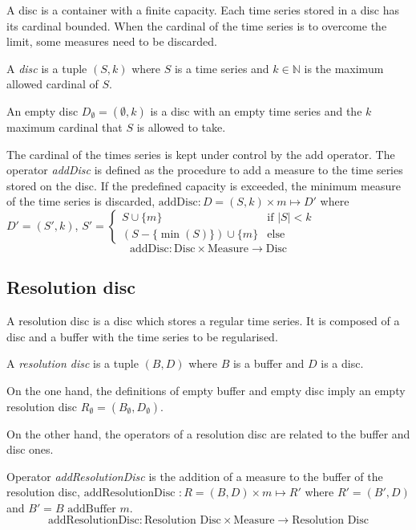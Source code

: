 A disc is a container with a finite capacity. Each time series stored
in a disc has its cardinal bounded. When the cardinal of the time
series is to overcome the limit, some measures need to be discarded.

\begin{definition}[Disc]
  A \emph{disc} is a tuple $(S,k)$ where $S$ is a time
  series and $k\in\mathbb{N}$ is the maximum allowed cardinal of $S$.
\end{definition}

An empty disc $D_{\emptyset} = (\emptyset,k)$ is a disc with an empty
time series and the $k$ maximum cardinal that $S$ is allowed to take.

The cardinal of the times series is kept under control by the add
operator.  The operator \emph{addDisc} is defined as the procedure to
add a measure to the time series stored on the disc. If the predefined
capacity is exceeded, the minimum measure of the time series is
discarded, $\text{addDisc}: D=(S,k) \times m \mapsto D'$ where $ D' =
(S',k)$, $ S' =
  \begin{cases}
      S\cup\{m\} &\text{if }  |S|<k\\
      (S-\{\min(S)\}) \cup \{m\} & \text{else }
    \end{cases}  
    $
  \[
  \text{addDisc}: \text{Disc} \times \text{Measure} \longrightarrow \text{Disc}
  \]



\subsection{Resolution disc}

A resolution disc is a disc which stores a regular time series. It is
composed of a disc and a buffer with the time series to be
regularised.

\begin{definition}
  A \emph{resolution disc} is a tuple $(B,D)$ where $B$
  is a buffer and $D$ is a disc.
\end{definition}
 
On the one hand, the definitions of empty buffer and empty disc imply
an empty resolution disc $R_{\emptyset} = (B_{\emptyset},D_{\emptyset})$.

On the other hand, the operators of a resolution disc are related to
the buffer and disc ones.

Operator \emph{addResolutionDisc} is the addition of a measure to the
buffer of the resolution disc, $\text{addResolutionDisc } : R=(B,D) \times m \mapsto R'$ where
$R'= (B',D)$ and $B'= B \text{ addBuffer } m$.
\[
\text{addResolutionDisc}: \text{Resolution Disc} \times \text{Measure}
\longrightarrow \text{Resolution Disc}
\]

